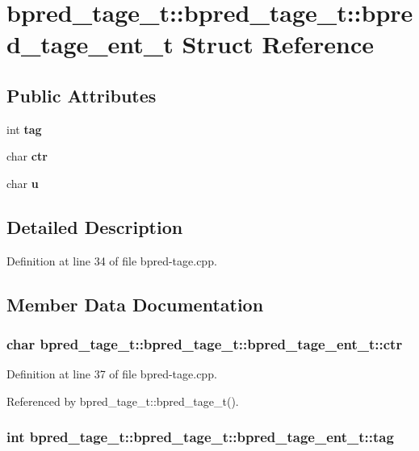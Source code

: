 \section{bpred\_\-tage\_\-t::bpred\_\-tage\_\-t::bpred\_\-tage\_\-ent\_\-t Struct Reference}
\label{structbpred__tage__t_1_1bpred__tage__ent__t}
\subsection*{Public Attributes}
\begin{CompactItemize}
\item 
int {\bf tag}
\item 
char {\bf ctr}
\item 
char {\bf u}
\end{CompactItemize}


\subsection{Detailed Description}


Definition at line 34 of file bpred-tage.cpp.

\subsection{Member Data Documentation}
\subsubsection[{ctr}]{\setlength{\rightskip}{0pt plus 5cm}char bpred\_\-tage\_\-t::bpred\_\-tage\_\-t::bpred\_\-tage\_\-ent\_\-t::ctr}\label{structbpred__tage__t_1_1bpred__tage__ent__t_595dd56f0d7ea4417e9358da8861c0e7}




Definition at line 37 of file bpred-tage.cpp.

Referenced by bpred\_\-tage\_\-t::bpred\_\-tage\_\-t().
\subsubsection[{tag}]{\setlength{\rightskip}{0pt plus 5cm}int bpred\_\-tage\_\-t::bpred\_\-tage\_\-t::bpred\_\-tage\_\-ent\_\-t::tag}\label{structbpred__tage__t_1_1bpred__tage__ent__t_9109ce079a8a7882090d7e52e21e2532}




